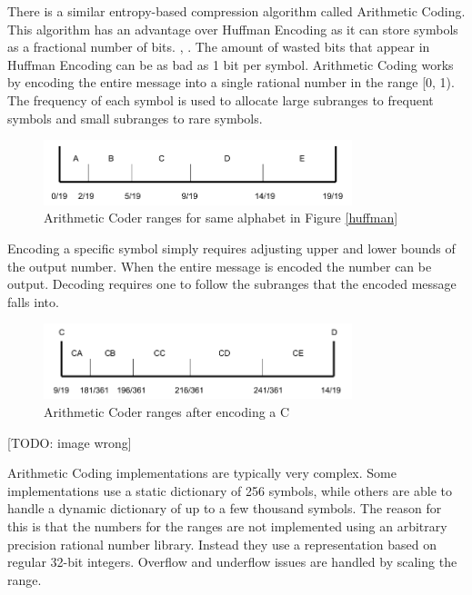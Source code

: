 \documentclass[a4paper,11pt]{report}
\begin{document}
There is a similar entropy-based compression algorithm called Arithmetic Coding. This algorithm has an advantage over Huffman Encoding as it can store symbols as a fractional number of bits. \cite{RefWorks:1}, \cite{RefWorks:3}. The amount of wasted bits that appear in Huffman Encoding can be as bad as 1 bit per symbol. Arithmetic Coding works by encoding the entire message into a single rational number in the range [0, 1). The frequency of each symbol is used to allocate large subranges to frequent symbols and small subranges to rare symbols. 

\begin{figure}
 \center
 \includegraphics[width=0.8\textwidth]{resources/ArithmeticCoder.png}
\caption{Arithmetic Coder ranges for same alphabet in Figure \ref{huffman}}
\label{arithmeticcoder}
\end{figure}

Encoding a specific symbol simply requires adjusting upper and lower bounds of the output number. When the entire message is encoded the number can be output. Decoding requires one to follow the subranges that the encoded message falls into.

\begin{figure}[h]
 \center
 \includegraphics[width=0.8\textwidth]{resources/ArithmeticCoderSubrange.png}
\caption{Arithmetic Coder ranges after encoding a C}
\label{arithmeticcodersubrange}
\end{figure}

[TODO: image wrong]

Arithmetic Coding implementations are typically very complex. Some implementations use a static dictionary of 256 symbols, while others are able to handle a dynamic dictionary of up to a few thousand symbols. The reason for this is that the numbers for the ranges are not implemented using an arbitrary precision rational number library. Instead they use a representation based on regular 32-bit integers. Overflow and underflow issues are handled by scaling the range.
\end{document}
